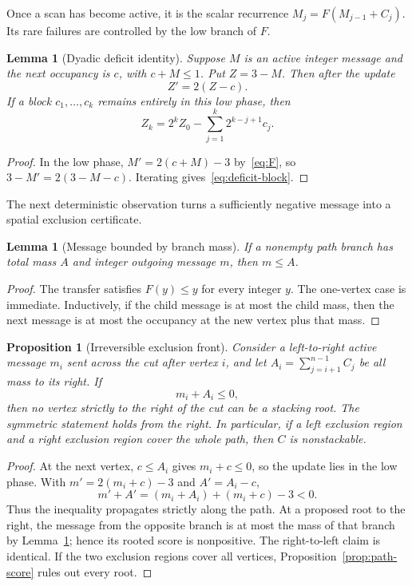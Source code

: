 \documentclass[11pt]{article}
\newtheorem{proposition}[theorem]{Proposition}
\newtheorem{lemma}[theorem]{Lemma}
\begin{document}
Once a scan has become active, it is the scalar recurrence
$M_j=F(M_{j-1}+C_j)$.  Its rare failures are controlled by the low branch of
$F$.

\begin{lemma}[Dyadic deficit identity]\label{lem:deficit}
Suppose $M$ is an active integer message and the next occupancy is $c$, with
$c+M\le1$.  Put $Z=3-M$.  Then after the update
\[
 Z'=2(Z-c).
 \tag{3.5}\label{eq:deficit-step}
\]
If a block $c_1,\dots,c_k$ remains entirely in this low phase, then
\[
 Z_k=2^kZ_0-\sum_{j=1}^k2^{k-j+1}c_j.
 \tag{3.6}\label{eq:deficit-block}
\]
\end{lemma}

\begin{proof}
In the low phase, $M'=2(c+M)-3$ by~\eqref{eq:F}, so
$3-M'=2(3-M-c)$.  Iterating gives~\eqref{eq:deficit-block}.
\end{proof}

The next deterministic observation turns a sufficiently negative message into
a spatial exclusion certificate.

\begin{lemma}[Message bounded by branch mass]\label{lem:message-mass}
If a nonempty path branch has total mass $A$ and integer outgoing message $m$,
then $m\le A$.
\end{lemma}

\begin{proof}
The transfer satisfies $F(y)\le y$ for every integer $y$.  The one-vertex case
is immediate.  Inductively, if the child message is at most the child mass,
then the next message is at most the occupancy at the new vertex plus that
mass.
\end{proof}

\begin{proposition}[Irreversible exclusion front]\label{prop:front}
Consider a left-to-right active message $m_i$ sent across the cut after vertex
$i$, and let
$A_i=\sum_{j=i+1}^{n-1}C_j$ be all mass to its right.  If
\[
 m_i+A_i\le0,
 \tag{3.7}\label{eq:front-condition}
\]
then no vertex strictly to the right of the cut can be a stacking root.  The
symmetric statement holds from the right.  In particular, if a left exclusion
region and a right exclusion region cover the whole path, then $C$ is
nonstackable.
\end{proposition}

\begin{proof}
At the next vertex, $c\le A_i$ gives $m_i+c\le0$, so the update lies in the low
phase.  With $m'=2(m_i+c)-3$ and $A'=A_i-c$,
\[
 m'+A'=(m_i+A_i)+(m_i+c)-3<0.
\]
Thus the inequality propagates strictly along the path.  At a proposed root
to the right, the message from the opposite branch is at most the mass of that
branch by Lemma~\ref{lem:message-mass}; hence its rooted score is nonpositive.
The right-to-left claim is identical.  If the two exclusion regions cover all
vertices, Proposition~\ref{prop:path-score} rules out every root.
\end{proof}
\end{document}
